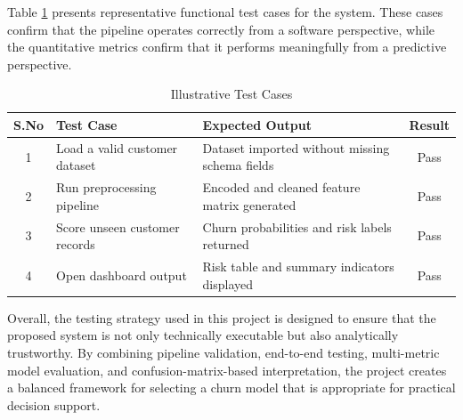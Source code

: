 Table \ref{tab:test_cases_main} presents representative functional test cases for the system. These cases confirm that the pipeline operates correctly from a software perspective, while the quantitative metrics confirm that it performs meaningfully from a predictive perspective.

\begin{table}[H]
\centering
\caption{Illustrative Test Cases}
\begin{tabular}{|c|p{3.7cm}|p{4.7cm}|c|}
\hline
\textbf{S.No} & \textbf{Test Case} & \textbf{Expected Output} & \textbf{Result} \\ \hline
1 & Load a valid customer dataset & Dataset imported without missing schema fields & Pass \\ \hline
2 & Run preprocessing pipeline & Encoded and cleaned feature matrix generated & Pass \\ \hline
3 & Score unseen customer records & Churn probabilities and risk labels returned & Pass \\ \hline
4 & Open dashboard output & Risk table and summary indicators displayed & Pass \\ \hline
\end{tabular}
\label{tab:test_cases_main}
\end{table}

Overall, the testing strategy used in this project is designed to ensure that the proposed system is not only technically executable but also analytically trustworthy. By combining pipeline validation, end-to-end testing, multi-metric model evaluation, and confusion-matrix-based interpretation, the project creates a balanced framework for selecting a churn model that is appropriate for practical decision support.
